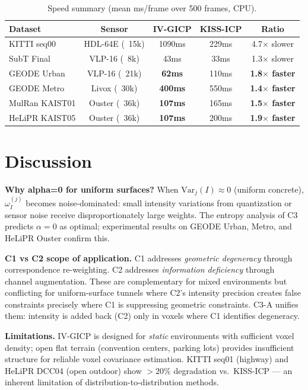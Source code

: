 \documentclass[letterpaper, 10pt, conference]{ieeeconf}
\newcommand{\best}[1]{\textbf{#1}}
\begin{document}
\begin{table}[t]
\centering
\caption{Speed summary (mean ms/frame over 500 frames, CPU).}
\label{tab:speed}
\begin{tabular}{lcccc}
\toprule
Dataset & Sensor & IV-GICP & KISS-ICP & Ratio \\
\midrule
KITTI seq00    & HDL-64E (~15k) & 1090ms & 229ms & 4.7$\times$ slower \\
SubT Final     & VLP-16 (~8k)   &  43ms  &  33ms & 1.3$\times$ slower \\
GEODE Urban    & VLP-16 (~21k)  & \best{62ms}  & 110ms & \textcolor{win}{\textbf{1.8$\times$ faster}} \\
GEODE Metro    & Livox (~30k)   & \best{400ms} & 550ms & \textcolor{win}{\textbf{1.4$\times$ faster}} \\
MulRan KAIST01 & Ouster (~36k)  & \best{107ms} & 165ms & \textcolor{win}{\textbf{1.5$\times$ faster}} \\
HeLiPR KAIST05 & Ouster (~36k)  & \best{107ms} & 200ms & \textcolor{win}{\textbf{1.9$\times$ faster}} \\
\bottomrule
\end{tabular}
\end{table}

\section{Discussion}\label{sec:discussion}

\textbf{Why alpha=0 for uniform surfaces?}
When $\mathrm{Var}_j(I) \approx 0$ (uniform concrete), $\omega_I^{(j)}$
becomes noise-dominated: small intensity variations from quantization or
sensor noise receive disproportionately large weights.
The entropy analysis of C3 predicts $\alpha{=}0$ as optimal; experimental
results on GEODE Urban, Metro, and HeLiPR Ouster confirm this.

\textbf{C1 vs C2 scope of application.}
C1 addresses \textit{geometric degeneracy} through correspondence re-weighting.
C2 addresses \textit{information deficiency} through channel augmentation.
These are complementary for mixed environments but conflicting for
uniform-surface tunnels where C2's intensity precision creates false constraints
precisely where C1 is suppressing geometric constraints.
C3-A unifies them: intensity is added back (C2) only in voxels where C1
identifies degeneracy.

\textbf{Limitations.}
IV-GICP is designed for \textit{static} environments with sufficient
voxel density; open flat terrain (convention centers, parking lots)
provides insufficient structure for reliable voxel covariance estimation.
KITTI seq01 (highway) and HeLiPR DCC04 (open outdoor) show $>20\%$ degradation
vs.\ KISS-ICP — an inherent limitation of distribution-to-distribution methods.
\end{document}
